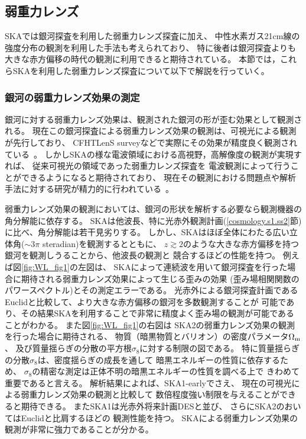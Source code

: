 \subsection{弱重力レンズ}\label{cosmology.s2.ss6}

SKAでは銀河探査を利用した弱重力レンズ探査に加え、
中性水素ガス21cm線の強度分布の観測を利用した手法も考えられており、
特に後者は銀河探査よりも大きな赤方偏移の時代の観測に利用できると期待されている。
本節では，これらSKAを利用した弱重力レンズ探査について以下で解説を行っていく。

\subsubsection{銀河の弱重力レンズ効果の測定}
%
銀河に対する弱重力レンズ効果は、観測された銀河の形が歪む効果として観測される。
現在この銀河探査による弱重力レンズ効果の観測は、可視光による観測が先行しており、
CFHTLenS surveyなどで実際にその効果が精度良く観測されている~\citep{Heymans:2013fya}。
%
しかしSKAの様な電波領域における高視野，高解像度の観測が実現すれば、
従来可視光の領域であった弱重力レンズ探査を
電波観測によって行うことができるようになると期待されており、
現在その観測における問題点や解析手法に対する研究が精力的に行われている~\citep{Brown:2015vqa,Patel:2015cra}。

弱重力レンズ効果の観測においては、銀河の形状を解析する必要なら観測機器の角分解能に依存する。
SKAは他波長、特に光赤外観測計画(\ref{cosmology.s1.ss2}節)に比べ、角分解能は若干見劣りする。
しかし、SKAはほぼ全体にわたる広い立体角($\sim 3\pi$ steradian)を観測するとともに、
$z\gtrsim 2$のような大きな赤方偏移を持つ銀河を観測しうることから、他波長の観測と
競合するほどの性能を持つ。
%
例えば図\ref{fig:WL_fig1}の左図は、
SKAによって連続波を用いて銀河探査を行った場合に期待される弱重力レンズ効果によって生じる歪みの効果
(歪み場相関関数のパワースペクトル)とその測定エラーである。
光赤外による銀河探査計画であるEuclidと比較して、より大きな赤方偏移の銀河を多数観測することが
可能であり、その結果SKAを利用することで非常に精度よく歪み場の観測が可能であることがわかる。
%
また図\ref{fig:WL_fig1}の右図は
SKA2の弱重力レンズ効果の観測を行った場合に期待される、
物質（暗黒物質とバリオン）の密度パラメータ$\Omega_{\rm m}$、
及び質量揺らぎの分散の平方根$\sigma_{8}$に対する制限の図である。
%
特に質量揺らぎの分散$\sigma_{8}$は、密度揺らぎの成長を通して
暗黒エネルギーの性質に依存するため、
$\sigma_{8}$の精密な測定は正体不明の暗黒エネルギーの性質を調べる上で
きわめて重要であると言える。
%
解析結果によれば、SKA1-earlyでさえ、
現在の可視光による弱重力レンズ効果の観測と比較して
数倍程度強い制限を与えることができると期待できる。
またSKA1は光赤外将来計画DESと並び、
さらにSKA2のおいてはEuclidと比肩するほどの
観測性能を持つ。
SKAによる弱重力レンズ効果の観測が非常に強力であることが分かる。


